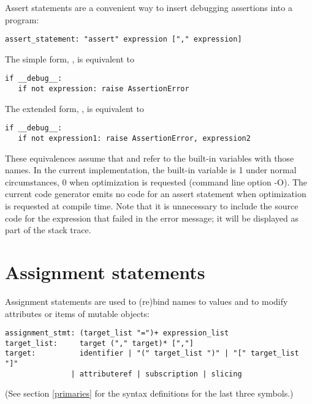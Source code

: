 Assert statements are a convenient way to insert
debugging assertions into a program:

\begin{verbatim}
assert_statement: "assert" expression ["," expression]
\end{verbatim}

The simple form, , is equivalent to

\begin{verbatim}
if __debug__:
   if not expression: raise AssertionError
\end{verbatim}

The extended form, , is
equivalent to

\begin{verbatim}
if __debug__:
   if not expression1: raise AssertionError, expression2
\end{verbatim}

These equivalences assume that  and
 refer to the built-in
variables with those names.  In the current implementation, the
built-in variable  is 1 under normal circumstances, 0
when optimization is requested (command line option -O).  The current
code generator emits no code for an assert statement when optimization
is requested at compile time.  Note that it is unnecessary to include
the source code for the expression that failed in the error message;
it will be displayed as part of the stack trace.


\section{Assignment statements \label{assignment}}

Assignment statements are used to
(re)bind names to values and to modify attributes or items of mutable
objects:

\begin{verbatim}
assignment_stmt: (target_list "=")+ expression_list
target_list:     target ("," target)* [","]
target:          identifier | "(" target_list ")" | "[" target_list "]"
               | attributeref | subscription | slicing
\end{verbatim}

(See section \ref{primaries} for the syntax definitions for the last
three symbols.)

